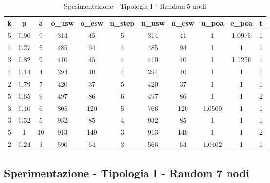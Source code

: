 \begin{table}[H]
\centering
\scalebox{0.9} {
\begin{tabular}{|c|c|c|c|c|c|c|c|c|c|c|}
\hline
\textbf{k} & \textbf{p} & \textbf{a} & \textbf{o\_usw} & \textbf{o\_esw} & \textbf{n\_step} & \textbf{n\_usw} & \textbf{n\_esw} & \textbf{u\_poa} & \textbf{e\_poa} & \textbf{t} \\ \hline
5 & 0.90 & 9 & 314 & 45 & 5 & 314 & 41 & 1 & 1.0975 & 1 \\ \hline
4 & 0.27 & 5 & 485 & 94 & 4 & 485 & 94 & 1 & 1 & 1 \\ \hline
3 & 0.82 & 9 & 410 & 45 & 4 & 410 & 40 & 1 & 1.1250 & 1 \\ \hline
4 & 0.14 & 4 & 394 & 40 & 4 & 394 & 40 & 1 & 1 & 1 \\ \hline
2 & 0.79 & 7 & 420 & 37 & 5 & 420 & 37 & 1 & 1 & 1 \\ \hline
5 & 0.65 & 9 & 497 & 86 & 6 & 497 & 86 & 1 & 1 & 2 \\ \hline
3 & 0.40 & 6 & 805 & 120 & 5 & 766 & 120 & 1.0509 & 1 & 1 \\ \hline
3 & 0.52 & 5 & 932 & 85 & 4 & 932 & 85 & 1 & 1 & 1 \\ \hline
5 & 1 & 10 & 913 & 149 & 3 & 913 & 149 & 1 & 1 & 2 \\ \hline
2 & 0.24 & 3 & 590 & 64 & 3 & 566 & 64 & 1.0402 & 1 & 1 \\ \hline
\end{tabular}
}
\caption{Sperimentazione - Tipologia I - Random 5 nodi}
\label{tab:sperimentazione-tipo1-5nodi}
\end{table}


\subsection{Sperimentazione - Tipologia I - Random 7 nodi}

